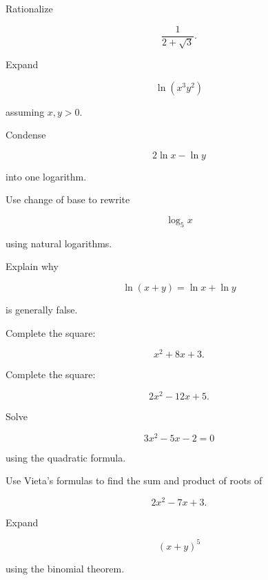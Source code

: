 \begin{exercise}[2]
Rationalize

\[
\frac{1}{2+\sqrt3}.
\]
\end{exercise}

\begin{exercise}[2]
Expand

\[
\ln(x^3y^2)
\]

assuming \(x,y>0\).
\end{exercise}

\begin{exercise}[2]
Condense

\[
2\ln x-\ln y
\]

into one logarithm.
\end{exercise}

\begin{exercise}[2]
Use change of base to rewrite

\[
\log_5x
\]

using natural logarithms.
\end{exercise}

\begin{exercise}[2]
Explain why

\[
\ln(x+y)
=
\ln x+\ln y
\]

is generally false.
\end{exercise}

\begin{exercise}[2]
Complete the square:

\[
x^2+8x+3.
\]
\end{exercise}

\begin{exercise}[2]
Complete the square:

\[
2x^2-12x+5.
\]
\end{exercise}

\begin{exercise}[2]
Solve

\[
3x^2-5x-2=0
\]

using the quadratic formula.
\end{exercise}

\begin{exercise}[2]
Use Vieta's formulas to find the sum and product of roots of

\[
2x^2-7x+3.
\]
\end{exercise}

\begin{exercise}[2]
Expand

\[
(x+y)^5
\]

using the binomial theorem.
\end{exercise}

